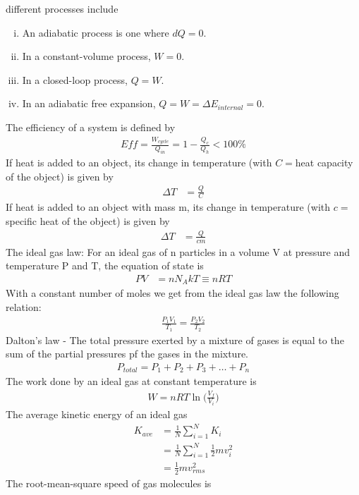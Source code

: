 \begin{multicols}{2}
different processes include
\begin{enumerate}[(i)]
	\item An adiabatic process is one where $dQ=0$.
	\item In a constant-volume process, $W=0$.
	\item In a closed-loop process, $Q=W$.
	\item In an adiabatic free expansion, $Q=W=\Delta E_{internal}=0$.
\end{enumerate}
The efficiency of a system is defined by
\begin{align}
Eff = \frac{W_{cycle}}{Q_{in}}=1-\frac{Q_c}{Q_h}<100\%
\end{align}
If heat is added to an object, its change in temperature (with $C=$heat capacity of the object) is given by 
\begin{align}
\Delta T &= \frac{Q}{C}
\end{align}
If heat is added to an object with mass m, its change in temperature (with $c=$specific heat of the object) is given by 
\begin{align}
\Delta T &= \frac{Q}{cm}
\end{align}
The ideal gas law: For an ideal gas of n particles in a volume V at pressure and temperature P and T, the equation of state is
\begin{align}
PV &=nN_AkT\equiv nRT
\end{align}
With a constant number of moles we get from the ideal gas law the following relation:
\begin{align}
\frac{P_1V_1}{T_1}=\frac{P_2V_2}{T_2}
\end{align}
Dalton's law - The total pressure exerted by a mixture of gases is equal to the sum of the partial pressures pf the gases in the mixture.
\begin{align}
P_{total}=P_1+P_2+P_3+\dots + P_n
\end{align}
The work done by an ideal gas at constant temperature is
\begin{align}
W=nRT\ln\bigg(\frac{V_f}{V_i}\bigg)
\end{align}
The average kinetic energy of an ideal gas
\begin{align}
K_{ave} &=\frac{1}{N}\sum_{i=1}^{N}K_i\\&=\frac{1}{N}\sum_{i=1}^{N}\frac{1}{2}mv_i^2\\&= \frac{1}{2}mv_{rms}^2
\end{align}
The root-mean-square speed of gas molecules is
\begin{align}

\end{align}
\end{multicols}
